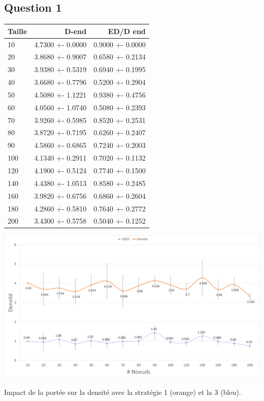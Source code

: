\documentclass[a4paper]{article}
\begin{document}
\subsection{Question 1}
\begin{center}
\begin{tabular}{|l|r|r|}
  \hline
Taille & D-end & ED/D end \\ \hline
10 & 4.7300 +- 0.0000 & 0.9000 +- 0.0000 \\ \hline
20 & 3.8680 +- 0.9007 & 0.6580 +- 0.2134 \\ \hline
30 & 3.9380 +- 0.5319 & 0.6940 +- 0.1995 \\ \hline
40 & 3.6680 +- 0.7796 & 0.5200 +- 0.2904 \\ \hline
50 & 4.5080 +- 1.1221 & 0.9380 +- 0.4756 \\ \hline
60 & 4.0560 +- 1.0740 & 0.5080 +- 0.2393 \\ \hline
70 & 3.9260 +- 0.5985 & 0.8520 +- 0.2531 \\ \hline
80 & 3.8720 +- 0.7195 & 0.6260 +- 0.2407 \\ \hline
90 & 4.5860 +- 0.6865 & 0.7240 +- 0.2003 \\ \hline
100 & 4.1340 +- 0.2911 & 0.7020 +- 0.1132 \\ \hline
120 & 4.1900 +- 0.5124 & 0.7740 +- 0.1500 \\ \hline
140 & 4.4380 +- 1.0513 & 0.8580 +- 0.2485 \\ \hline
160 & 3.9820 +- 0.6756 & 0.6860 +- 0.2604 \\ \hline
180 & 4.2860 +- 0.5810 & 0.7640 +- 0.2772 \\ \hline
200 & 3.4300 +- 0.5758 & 0.5040 +- 0.1252 \\ \hline
\end{tabular}
\end{center}

\begin{center}
\begin{minipage}[c]{\linewidth}
\includegraphics[width=\textwidth]{images/ex2.png}
\begin{center}
  Impact de la portée sur la densité avec la stratégie 1
  (orange) et la 3 (bleu).
  \end{center}
\end{minipage}
\end{center}
\end{document}
